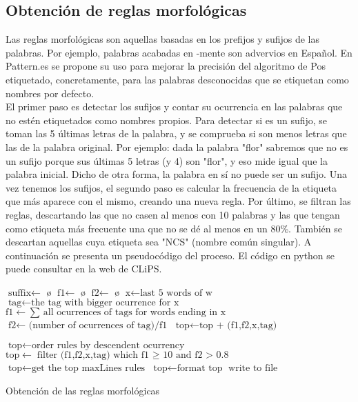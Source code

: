 \subsection*{Obtención de reglas morfológicas}
Las reglas morfológicas son aquellas basadas en los prefijos y sufijos de las palabras. Por ejemplo, 
palabras acabadas en \textsf{-mente} son advervios en Español. En \textcolor{SchoolColor}{Pattern.es} se propone su uso para mejorar la precisión del algoritmo de Pos etiquetado, concretamente, para las palabras desconocidas que se etiquetan como nombres por defecto.\\[\baselineskip]
El primer paso es detectar los sufijos y contar su ocurrencia en las palabras que no estén etiquetados como nombres propios. Para detectar si es un sufijo, se toman las 5 últimas letras de la palabra, y se comprueba si son menos letras que las de la palabra original. Por ejemplo: dada la palabra "flor" sabremos que no es un sufijo porque sus últimas 5 letras (y 4) son "flor", y eso mide igual que la palabra inicial. Dicho de otra forma, la palabra en sí no puede ser un sufijo.\newline
Una vez tenemos los sufijos, el segundo paso es calcular la frecuencia de la etiqueta que más aparece con el mismo, creando una nueva regla. Por último, se filtran las reglas, descartando las que no casen al menos con 10 palabras y las que tengan como etiqueta más frecuente una que no se dé al menos en un 80\%. También se descartan aquellas cuya etiqueta sea \textsf{"NCS"} (nombre común singular). A continuación se presenta un pseudocódigo del proceso. El código en python se puede consultar en la web de \textcolor{SchoolColor}{CLiPS}.
\begin{algorithm}[H]
    \begin{algorithmic}[1]
    \State $\text{suffix} \gets$ \o
    \State $\text{f1} \gets$ \o
    \State $\text{f2} \gets$ \o 
            \State $\text{x} \gets \text{last 5 words of w}$
             \State {} \EndIf
            \EndFor
    \EndFor        
    		\State $\text{tag} \gets \text{the tag with bigger ocurrence for x}$
            \State $\text{f1} \gets \text{$\sum$ all ocurrences of tags for words ending in x}$
            \State $\text{f2} \gets \text{ (number of ocurrences of tag)/f1}$ 
            \State $\text{top} \gets \text{top + (f1,f2,x,tag) }$
    \EndFor
            
     \State $\text{top} \gets \text{order rules by descendent ocurrency}$
     \State $\text{top} \gets \text{filter (f1,f2,x,tag) which f1 $\geq$ 10 and f2 > 0.8 }$
     \State $\text{top} \gets \text{get the top maxLines rules}$
     \State $\text{top} \gets \text{format top}$
     \State $\text{write to file}$     
        \EndProcedure
    \end{algorithmic}
    \label{alg:rAP}
    \caption{Obtención de las reglas morfológicas}
\end{algorithm}       

